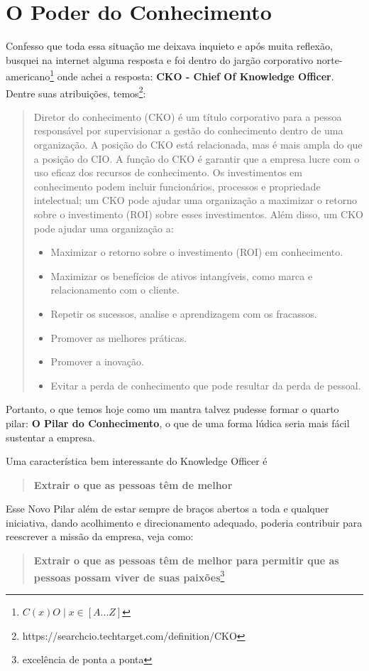 \section{O Poder do Conhecimento}

Confesso que toda essa situação me deixava inquieto e após muita reflexão, busquei na internet alguma resposta e foi dentro do jargão corporativo norte-americano\footnote{$C(x)O \; | \; x \in [A...Z]$} onde achei a resposta: \textbf{CKO - Chief Of Knowledge Officer}. Dentre suas atribuições, temos\footnote{https://searchcio.techtarget.com/definition/CKO}:
\begin{quotation}
    Diretor do conhecimento (CKO) é um título corporativo para a pessoa responsável por supervisionar a gestão do conhecimento dentro de uma organização. A posição do CKO está relacionada, mas é mais ampla do que a posição do CIO. A função do CKO é garantir que a empresa lucre com o uso eficaz dos recursos de conhecimento. Os investimentos em conhecimento podem incluir funcionários, processos e propriedade intelectual; um CKO pode ajudar uma organização a maximizar o retorno sobre o investimento (ROI) sobre esses investimentos.
    Além disso, um CKO pode ajudar uma organização a:
    \begin{itemize}
        \item Maximizar o retorno sobre o investimento (ROI) em conhecimento.
        \item Maximizar os benefícios de ativos intangíveis, como marca e relacionamento com o cliente.
        \item Repetir os sucessos, analise e aprendizagem com os fracassos.
        \item Promover as melhores práticas.
        \item Promover a inovação.
        \item Evitar a perda de conhecimento que pode resultar da perda de pessoal.
    \end{itemize}
\end{quotation}

Portanto, o que temos hoje como um mantra talvez pudesse formar o quarto pilar: \textbf{O Pilar do Conhecimento}, o que de uma forma lúdica seria mais fácil sustentar a empresa.

Uma característica bem interessante do Knowledge Officer é
\begin{quotation}
    \textbf{Extrair o que as pessoas têm de melhor}
\end{quotation}
Esse Novo Pilar além de estar sempre de braços abertos a toda e qualquer iniciativa, dando acolhimento e direcionamento adequado, poderia contribuir para reescrever a missão da empresa, veja como:
\begin{quotation}
    \textbf{Extrair o que as pessoas têm de melhor para permitir que as pessoas possam viver de suas paixões}\footnote{excelência de ponta a ponta}
\end{quotation}



